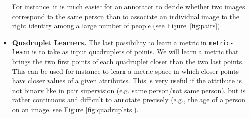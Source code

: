 \documentclass[twoside,11pt]{article}
\begin{document}
\begin{itemize}
For instance, it is much easier for an annotator to decide whether two images correspond to the same person than to associate an individual image to the right identity among a large number of people (see Figure~\ref{fig:pairs}). 
\item \textbf{Quadruplet Learners.}
The last possibility to learn a metric in \texttt{metric-learn} is to take as input quadruplets of points. We will learn a metric that brings the two first points of each quadruplet closer than the two last points. This can be used for instance to learn a metric space in which closer points have closer values of a given attributes. This is very useful if the attribute is not binary like in pair supervision (e.g. same person/not same person), but is rather continuous and difficult to annotate precisely (e.g., the age of a person on an image, see Figure \ref{fig:quadruplets}).
\end{itemize}
\end{document}
